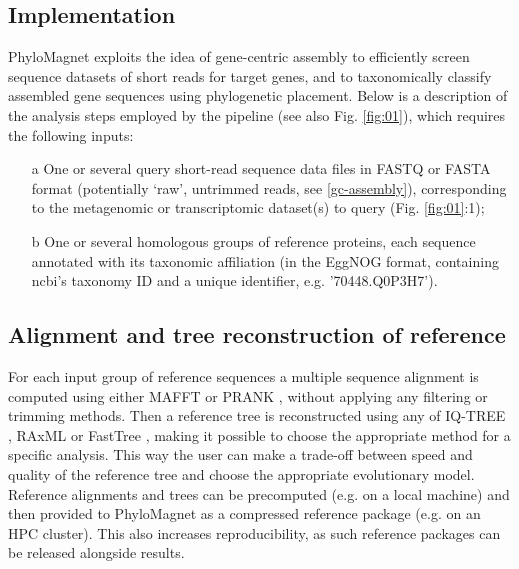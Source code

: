 \documentclass{bioinfo}
\begin{document}
\begin{methods}
\section{Implementation}\label{implementation}
PhyloMagnet exploits the idea of gene-centric assembly \citep{Huson2017} to efficiently screen sequence datasets  of short reads for target genes, and to taxonomically classify assembled gene sequences using phylogenetic placement. Below is a description of the analysis steps employed by the pipeline (see also Fig. \ref{fig:01}), which requires the following inputs: 
\begin{enumerate}

\item[a] One or several query short-read sequence data files in FASTQ or FASTA format (potentially ‘raw’, untrimmed reads, see \ref{gc-assembly}), corresponding to the metagenomic or transcriptomic dataset(s) to query (Fig. \ref{fig:01}:1);
\item[b] One or several homologous groups of reference proteins, each sequence annotated with its taxonomic affiliation (in the EggNOG format, containing ncbi’s taxonomy ID and a unique identifier, e.g. '70448.Q0P3H7').
\end{enumerate}

\subsection{Alignment and tree reconstruction of reference}
For each input group of reference sequences a multiple sequence alignment is computed using either MAFFT \citep{Katoh2013} or PRANK \citep{Loytynoja2010}, without applying any filtering or trimming methods. Then a reference tree is reconstructed using any of IQ-TREE \citep{Nguyen2015}, RAxML \citep{Stamatakis2014} or FastTree \citep{Price2010}, making it possible to choose the appropriate method for a specific analysis. This way the user can make a trade-off between speed and quality of the reference tree and choose the appropriate evolutionary model. Reference alignments and trees can be precomputed (e.g. on a local machine) and then provided to PhyloMagnet as a compressed reference package (e.g. on an HPC cluster). This also increases reproducibility, as such reference packages can be released alongside results.


\end{methods}
\end{document}
